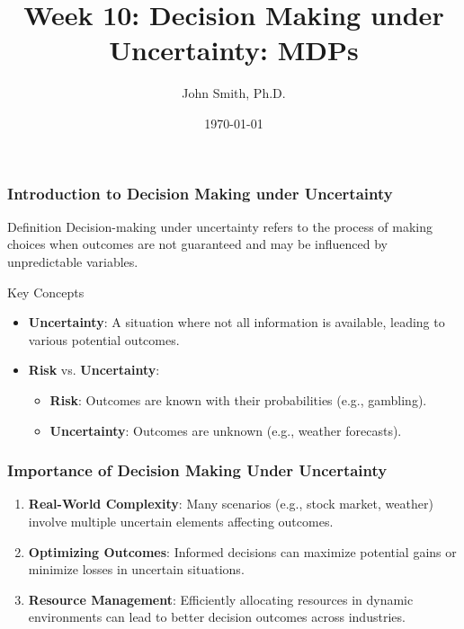 \documentclass[aspectratio=169]{beamer}
\title[Decision Making under Uncertainty]{Week 10: Decision Making under Uncertainty: MDPs}
\author[J. Smith]{John Smith, Ph.D.}
\date{\today}
\begin{document}
\frame{\titlepage}

\begin{frame}[fragile]
    \frametitle{Introduction to Decision Making under Uncertainty}
    
    \begin{block}{Definition}
        Decision-making under uncertainty refers to the process of making choices when outcomes are not guaranteed and may be influenced by unpredictable variables. 
    \end{block}
    
    \begin{block}{Key Concepts}
        \begin{itemize}
            \item \textbf{Uncertainty}: A situation where not all information is available, leading to various potential outcomes.
            \item \textbf{Risk} vs. \textbf{Uncertainty}:
            \begin{itemize}
                \item \textbf{Risk}: Outcomes are known with their probabilities (e.g., gambling).
                \item \textbf{Uncertainty}: Outcomes are unknown (e.g., weather forecasts).
            \end{itemize}
        \end{itemize}
    \end{block}
\end{frame}

\begin{frame}[fragile]
    \frametitle{Importance of Decision Making Under Uncertainty}
    
    \begin{enumerate}
        \item \textbf{Real-World Complexity}: Many scenarios (e.g., stock market, weather) involve multiple uncertain elements affecting outcomes.
        \item \textbf{Optimizing Outcomes}: Informed decisions can maximize potential gains or minimize losses in uncertain situations.
        \item \textbf{Resource Management}: Efficiently allocating resources in dynamic environments can lead to better decision outcomes across industries.
    \end{enumerate}
\end{frame}
\end{document}
